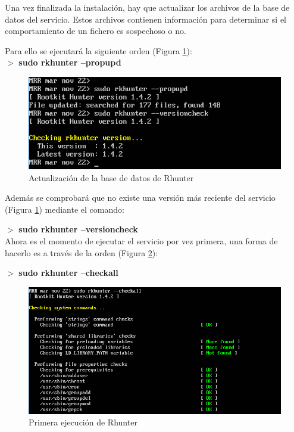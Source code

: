 \begin{itemize}
	Una vez finalizada la instalación, hay que actualizar los archivos de la base de datos del servicio. Estos archivos contienen información para determinar si el comportamiento de un fichero es sospechoso o no.
	
	Para ello se ejecutará la siguiente orden (Figura \ref{fig:figura84}):
	\\
	
	$ > $ \textbf{sudo rkhunter --propupd}
	
	\begin{figure}[H] %
		\centering
		\includegraphics[scale=0.8]{figuras/figura84.png} 
		\caption{Actualización de la base de datos de Rhunter} 
		\label{fig:figura84}
	\end{figure}
	
	Además se comprobará que no existe una versión más reciente del servicio (Figura \ref{fig:figura84}) mediante el comando:
	
	$ > $ \textbf{sudo rkhunter --versioncheck}
	\\
	
	Ahora es el momento de ejecutar el servicio por vez primera, una forma de hacerlo es a través de la orden (Figura \ref{fig:figura85}):
	
	$ > $ \textbf{sudo rkhunter --checkall}
	
	\begin{figure}[H] %
		\centering
		\includegraphics[scale=0.7]{figuras/figura85.png} 
		\caption{Primera ejecución de Rhunter} 
		\label{fig:figura85}
	\end{figure}


\end{itemize}
